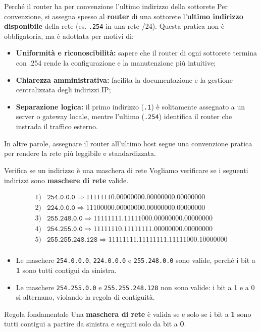 \documentclass[a4paper,12pt]{report}
\begin{document}
\begin{notebox}{Perché il router ha per convenzione l’ultimo indirizzo della sottorete}
Per convenzione, si assegna spesso al \textbf{router} di una sottorete l’\textbf{ultimo indirizzo disponibile} della rete (es. \texttt{.254} in una rete /24).  
Questa pratica non è obbligatoria, ma è adottata per motivi di:
\begin{itemize}
    \item \textbf{Uniformità e riconoscibilità:} sapere che il router di ogni sottorete termina con .254 rende la configurazione e la manutenzione più intuitive;
    \item \textbf{Chiarezza amministrativa:} facilita la documentazione e la gestione centralizzata degli indirizzi IP;
    \item \textbf{Separazione logica:} il primo indirizzo (\texttt{.1}) è solitamente assegnato a un server o gateway locale, mentre l’ultimo (\texttt{.254}) identifica il router che instrada il traffico esterno.
\end{itemize}
In altre parole, assegnare il router all’ultimo host segue una convenzione pratica per rendere la rete più leggibile e standardizzata.
\end{notebox}

\begin{esempiobox}{ Verifica se un indirizzo è una maschera di rete}
Vogliamo verificare se i seguenti indirizzi sono \textbf{maschere di rete} valide.

\[
\begin{array}{ll}
1) & \texttt{254.0.0.0} \Rightarrow 11111110.00000000.00000000.00000000 \\
2) & \texttt{224.0.0.0} \Rightarrow 11100000.00000000.00000000.00000000 \\
3) & \texttt{255.248.0.0} \Rightarrow 11111111.11111000.00000000.00000000 \\
4) & \texttt{254.255.0.0} \Rightarrow 11111110.11111111.00000000.00000000 \\
5) & \texttt{255.255.248.128} \Rightarrow 11111111.11111111.11111000.10000000 \\
\end{array}
\]

\begin{itemize}
    \item Le maschere \texttt{254.0.0.0}, \texttt{224.0.0.0} e \texttt{255.248.0.0} sono valide, perché i bit a \textbf{1} sono tutti contigui da sinistra.
    \item Le maschere \texttt{254.255.0.0} e \texttt{255.255.248.128} non sono valide: i bit a 1 e a 0 si alternano, violando la regola di contiguità.
\end{itemize}

\begin{notebox}{Regola fondamentale}
Una \textbf{maschera di rete} è valida se e solo se i bit a \textbf{1} sono tutti contigui a partire da sinistra e seguiti solo da bit a \textbf{0}.
\end{notebox}
\end{esempiobox}
\end{document}
